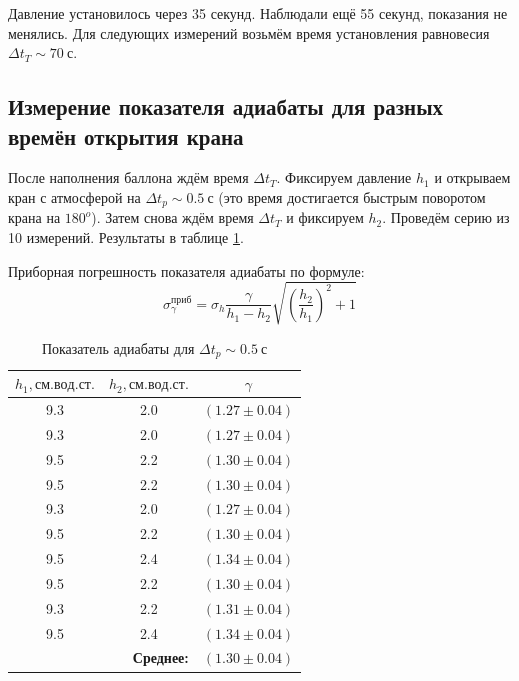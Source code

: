 \documentclass[a4paper, 12pt]{article}
\begin{document}
			Давление установилось через 35 секунд. Наблюдали ещё 55 секунд, показания не менялись. Для следующих измерений возьмём время установления равновесия $\Delta t_T \sim 70~с$.

		\subsection{Измерение показателя адиабаты для разных времён открытия крана}

			После наполнения баллона ждём время $\Delta t_T$. Фиксируем давление $h_1$ и открываем кран с атмосферой на $\Delta t_p \sim 0.5~с$ (это время достигается быстрым поворотом крана на $180^o$). Затем снова ждём время $\Delta t_T$ и фиксируем $h_2$. Проведём серию из 10 измерений. Результаты в таблице \ref{table:gamma_1}.

			Приборная погрешность показателя адиабаты по формуле:
			$$
				\sigma_{\gamma}^{приб} = \sigma_h \frac{\gamma}{h_1 - h_2} \sqrt{\left( \frac{h_2}{h_1} \right)^2 + 1}
			$$

			\begin{table}[!ht]
				\centering
				\begin{tabular}{|c|c|c|}
					\hline

					$h_1, см.вод.ст.$ & $h_2, см.вод.ст.$ & $\gamma$\\ \hline
					9.3 & 2.0 & $(1.27 \pm 0.04)$\\ \hline
					9.3 & 2.0 & $(1.27 \pm 0.04)$\\ \hline
					9.5 & 2.2 & $(1.30 \pm 0.04)$\\ \hline
					9.5 & 2.2 & $(1.30 \pm 0.04)$\\ \hline
					9.3 & 2.0 & $(1.27 \pm 0.04)$\\ \hline
					9.5 & 2.2 & $(1.30 \pm 0.04)$\\ \hline
					9.5 & 2.4 & $(1.34 \pm 0.04)$\\ \hline
					9.5 & 2.2 & $(1.30 \pm 0.04)$\\ \hline
					9.3 & 2.2 & $(1.31 \pm 0.04)$\\ \hline
					9.5 & 2.4 & $(1.34 \pm 0.04)$\\ \hline
					\multicolumn{2}{|r|}{\textbf{Среднее:}} & $\boldsymbol{(1.30 \pm 0.04)}$ \\ \hline

				\end{tabular}
				\caption{Показатель адиабаты для $\Delta t_p \sim 0.5~с$}
				\label{table:gamma_1}
			\end{table}
\end{document}
